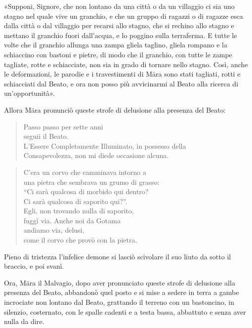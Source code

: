 «Supponi, Signore, che non lontano da una città o da un villaggio ci sia uno
stagno nel quale vive un granchio, e che un gruppo di ragazzi o di ragazze esca
dalla città o dal villaggio per recarsi allo stagno, che si rechino allo stagno
e mettano il granchio fuori dall’acqua, e lo poggino sulla terraferma. E tutte
le volte che il granchio allunga una zampa gliela taglino, gliela rompano e la
schiaccino con bastoni e pietre, di modo che il granchio, con tutte le zampe
tagliate, rotte e schiacciate, non sia in grado di tornare nello stagno. Così,
anche le deformazioni, le parodie e i travestimenti di Māra sono stati tagliati,
rotti e schiacciati dal Beato, e ora non posso più avvicinarmi al Beato alla
ricerca di un’opportunità».

Allora Māra pronunciò queste strofe di delusione alla presenza del Beato:


\begin{quote}
Passo passo per sette anni \\
seguii il Beato. \\
L’Essere Completamente Illuminato, in possesso della \\
Consapevolezza, non mi diede occasione alcuna.
\end{quote}


\begin{quote}
C’era un \label{pag70A}corvo che camminava intorno a \\
una pietra che sembrava un grumo di grasso: \\
“Ci sarà qualcosa di morbido qui dentro? \\
Ci sarà qualcosa di saporito qui?”. \\
Egli, non trovando nulla di saporito, \\
fuggì via. Anche noi da Gotama \\
andiamo via, delusi, \\
come il corvo che provò con la pietra.
\end{quote}

Pieno di tristezza l’infelice demone si lasciò scivolare il suo liuto da sotto
il braccio, e poi svanì.


Ora, Māra il Malvagio, dopo aver pronunciato queste strofe di delusione alla
presenza del Beato, abbandonò quel posto e si mise a sedere in terra a gambe
incrociate non lontano dal Beato, grattando il terreno con un bastoncino, in
silenzio, costernato, con le spalle cadenti e a testa bassa, abbattuto e senza
aver nulla da dire.

